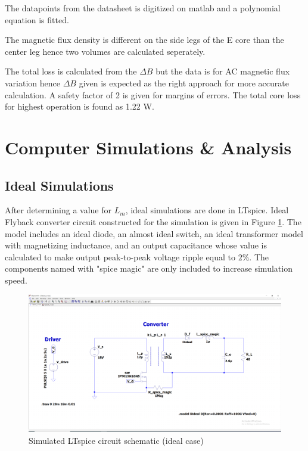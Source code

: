 \documentclass[12pt]{article}
\begin{document}
    The datapoints from the datasheet is digitized on matlab and a polynomial equation is fitted. 

    The magnetic flux density is different on the side legs of the E core than the center leg hence two volumes are calculated seperately. 

    The total loss is calculated from the $\Delta B $ but the data is for AC magnetic flux variation hence $\Delta B $ given is expected as the right approach for more accurate calculation. A safety factor of 2 is given for margins of errors. The total core loss for highest operation is found as 1.22 W.
    


    
    

    

\section{Computer Simulations \& Analysis}

    \subsection{Ideal Simulations}
    After determining a value for $L_m$, ideal simulations are done in LTspice. Ideal Flyback converter circuit constructed for the simulation is given in Figure \ref{fig:ideal_sim_circuit}. The model includes an ideal diode, an almost ideal switch, an ideal transformer model with magnetizing inductance, and an output capacitance whose value is calculated to make output peak-to-peak voltage ripple equal to $2\%$. The components named with "spice magic" are only included to increase simulation speed.  \\
    
    \begin{figure}[H]
        \centering
        \includegraphics[scale=0.3]{img/Spice_Sim/Ideal/ideal_simulation_circuit.PNG}
        \caption{Simulated LTspice circuit schematic (ideal case)}
        \label{fig:ideal_sim_circuit}
    \end{figure}
\end{document}
